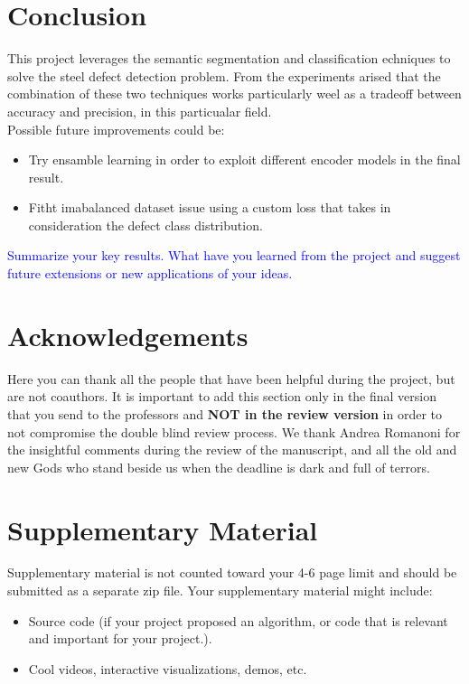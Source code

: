 \documentclass[10pt,twocolumn,letterpaper]{article}
\begin{document}
\section{Conclusion} 
This project leverages the semantic segmentation and classification echniques to solve the steel defect detection problem. From the experiments arised that the combination of these two techniques works particularly weel as a tradeoff between accuracy and precision, in this particualar field.\\
Possible future improvements could be:
\begin{itemize}
   \item Try ensamble learning in order to exploit different encoder models in the final result.
   \item Fitht imabalanced dataset issue using a custom loss that takes in consideration the defect class distribution.
\end{itemize}

\textcolor{blue}{
Summarize your key results. What have you learned from the project and suggest future extensions or new applications of your ideas.}





\section*{Acknowledgements}
Here you can thank all the people that have been helpful during the project, but are not coauthors. It is important to add this section only in the final version that you send to the professors and \textbf{NOT in the review version} in order to not compromise the double blind review process. We thank Andrea Romanoni for the insightful comments during the review of the manuscript, and all the old and new Gods who stand beside us when the deadline is dark and full of terrors. 

\appendix
\section{Supplementary Material} 
Supplementary material is not counted toward your 4-6 page limit and should be submitted as a separate zip file. Your supplementary material might include:
\begin{itemize}
    \item Source code (if your project proposed an algorithm, or code that is relevant and important for your project.).
    \item Cool videos, interactive visualizations, demos, etc.
\end{itemize}
\end{document}
